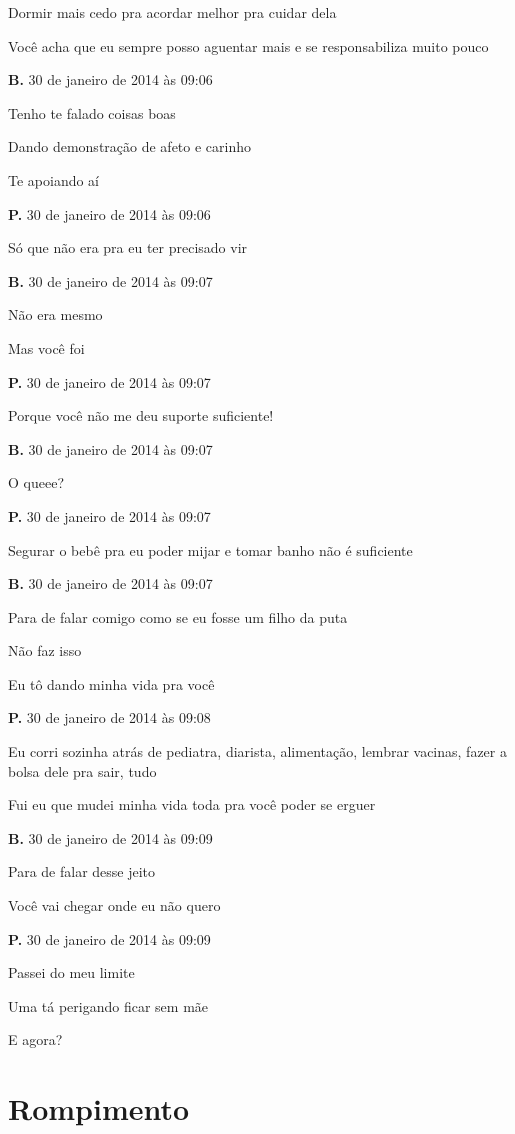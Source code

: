 Dormir mais cedo pra acordar melhor pra cuidar dela

Você acha que eu sempre posso aguentar mais e se responsabiliza muito
pouco

\textbf{B.} 30 de janeiro de 2014 às 09:06

Tenho te falado coisas boas

Dando demonstração de afeto e carinho

Te apoiando aí

\textbf{P.} 30 de janeiro de 2014 às 09:06

Só que não era pra eu ter precisado vir

\textbf{B.} 30 de janeiro de 2014 às 09:07

Não era mesmo

Mas você foi

\textbf{P.} 30 de janeiro de 2014 às 09:07

Porque você não me deu suporte suficiente!

\textbf{B.} 30 de janeiro de 2014 às 09:07

O queee?

\textbf{P.} 30 de janeiro de 2014 às 09:07

Segurar o bebê pra eu poder mijar e tomar banho não é suficiente

\textbf{B.} 30 de janeiro de 2014 às 09:07

Para de falar comigo como se eu fosse um filho da puta

Não faz isso

Eu tô dando minha vida pra você

\textbf{P.} 30 de janeiro de 2014 às 09:08

Eu corri sozinha atrás de pediatra, diarista, alimentação, lembrar
vacinas, fazer a bolsa dele pra sair, tudo

Fui eu que mudei minha vida toda pra você poder se erguer

\textbf{B.} 30 de janeiro de 2014 às 09:09

Para de falar desse jeito

Você vai chegar onde eu não quero

\textbf{P.} 30 de janeiro de 2014 às 09:09

Passei do meu limite

Uma tá perigando ficar sem mãe

E agora?

\chapter{Rompimento}

